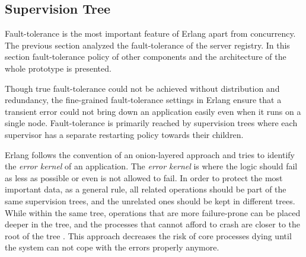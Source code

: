 \subsection{Supervision Tree}\label{supervision_tree}




Fault-tolerance is the most important feature of Erlang apart from concurrency. The previous section analyzed the fault-tolerance of the server registry. In this section fault-tolerance policy of other components and the architecture of the whole prototype is presented.

Though true fault-tolerance could not be achieved without distribution and redundancy, the fine-grained fault-tolerance settings in Erlang ensure that a transient error could not bring down an application easily even when it runs on a single node. Fault-tolerance is primarily reached by supervision trees where each supervisor has a separate restarting policy towards their children. 

Erlang follows the convention of an onion-layered approach and tries to identify the \textit{error kernel} of an application. The \textit{error kernel} is where the logic should fail as less as possible or even is not allowed to fail. In order to protect the most important data, as a general rule, all related operations should be part of the same supervision trees, and the unrelated ones should be kept in different trees. While within the same tree, operations that are more failure-prone can be placed deeper in the tree, and the processes that cannot afford to crash are closer to the root of the tree \autocite{learn_you_some_erlang}. This approach decreases the risk of core processes dying until the system can not cope with the errors properly anymore.

